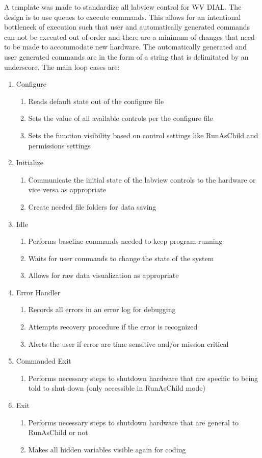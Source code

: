 A template was made to standardize all labview control for WV DIAL. The design is to use queues to execute commands. This allows for an intentional bottleneck of execution such that user and automatically generated commands can not be executed out of order and there are a minimum of changes that need to be made to accommodate new hardware. The automatically generated and user generated commands are in the form of a string that is delimitated by an underscore. The main loop cases are:
\begin{enumerate}
\item{Configure}
\begin{enumerate}
\item{Reads default state out of the configure file}
\item{Sets the value of all available controls per the configure file}
\item{Sets the function visibility based on control settings like RunAsChild and permissions settings}
\end{enumerate}
\item{Initialize}
\begin{enumerate}
\item{Communicate the initial state of the labview controls to the hardware or vice versa as appropriate}
\item{Create needed file folders for data saving}
\end{enumerate}
\item{Idle}
\begin{enumerate}
\item{Performs baseline commands needed to keep program running}
\item{Waits for user commands to change the state of the system}
\item{Allows for raw data visualization as appropriate}
\end{enumerate}
\item{Error Handler}
\begin{enumerate}
\item{Records all errors in an error log for debugging}
\item{Attempts recovery procedure if the error is recognized}
\item{Alerts the user if error are time sensitive and/or mission critical}
\end{enumerate}
\item{Commanded Exit}
\begin{enumerate}
\item{Performs necessary steps to shutdown hardware that are specific to being told to shut down (only accessible in RunAsChild mode)}
\end{enumerate}
\item{Exit}
\begin{enumerate}
\item{Performs necessary steps to shutdown hardware that are general to RunAsChild or not}
\item{Makes all hidden variables visible again for coding}
\end{enumerate}
\end{enumerate}


